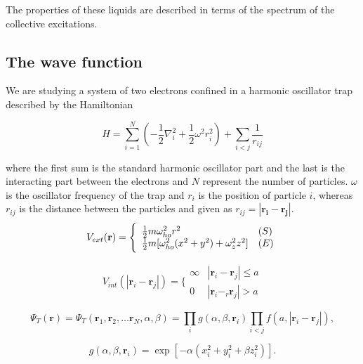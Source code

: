 The properties of these liquids are described in terms of the spectrum of the collective excitations.

\subsection{The wave function}
We are studying a system of two electrons confined in a harmonic oscillator trap described by the Hamiltonian 

\begin{equation}\label{eq:hamilt}
\hat{H} = \sum_{i=1}^N \left( - \frac{1}{2} \nabla_i^2 + \frac{1}{2} \omega^2 r_i^2 \right) + \sum_{i<j} \frac{1}{r_{ij}}
\end{equation}

where the first sum is the standard harmonic oscillator part and the last is the interacting part between the electrons and $N$ represent the number of particles. $\omega$ is the oscillator frequency of the trap and $r_i$ is the position of particle $i$, whereas $r_{ij}$ is the distance between the particles and given as $r_{ij} = |\mathbf{r_i} - \mathbf{r_j}|$. \\

\begin{equation} \label{eq:trap_potential}
 V_{ext}(\mathbf{r}) = 
 \Bigg\{
 \begin{array}{ll}
	 \frac{1}{2}m\omega_{ho}^2r^2 & (S)\\
 \strut
	 \frac{1}{2}m[\omega_{ho}^2(x^2+y^2) + \omega_z^2z^2] & (E)
 \end{array}
\end{equation}

\begin{equation} \label{eq:potential_internal}
 V_{int}(|\mathbf{r}_i-\mathbf{r}_j|) =  \Bigg\{
 \begin{array}{ll}
	 \infty & {|\mathbf{r}_i-\mathbf{r}_j|} \leq {a}\\
	 0 & {|\mathbf{r}_i-_r\mathbf{r}_j|} > {a}
 \end{array}
\end{equation}

\begin{equation} \label{eq:trialwf}
 \Psi_T(\mathbf{r})=\Psi_T(\mathbf{r}_1, \mathbf{r}_2, \dots \mathbf{r}_N,\alpha,\beta)=\prod_i g(\alpha,\beta,\mathbf{r}_i)\prod_{i < j}f(a,|\mathbf{r}_i-\mathbf{r}_j|),
\end{equation}

\begin{equation} \label{eq:spf_g}
g(\alpha,\beta,\mathbf{r}_i)= \exp{[-\alpha(x_i^2+y_i^2+\beta z_i^2)]}.
\end{equation}

